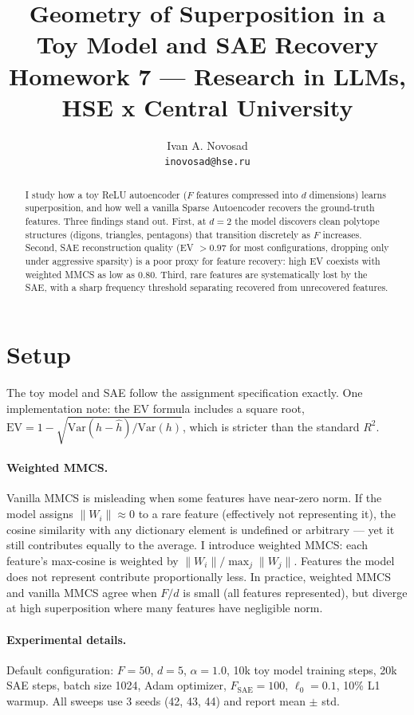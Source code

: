 \documentclass[10pt,twocolumn]{article}
\title{Geometry of Superposition in a Toy Model and SAE Recovery \\[6pt]
       \normalsize Homework 7 --- Research in LLMs, HSE x Central University}
\author{Ivan A. Novosad \\ \texttt{inovosad@hse.ru}}
\date{}
\begin{document}
\maketitle

\begin{abstract}
I study how a toy ReLU autoencoder ($F$ features compressed into $d$ dimensions)
learns superposition, and how well a vanilla Sparse Autoencoder recovers the
ground-truth features. Three findings stand out. First, at $d{=}2$ the model
discovers clean polytope structures (digons, triangles, pentagons) that transition
discretely as $F$ increases. Second, SAE reconstruction quality (EV $> 0.97$ for most configurations,
dropping only under aggressive sparsity) is a poor proxy for feature recovery: high EV
coexists with weighted MMCS as low as 0.80. Third, rare features are
systematically lost by the SAE, with a sharp frequency threshold separating
recovered from unrecovered features.
\end{abstract}

\section{Setup}
\label{sec:setup}

The toy model and SAE follow the assignment specification exactly. One
implementation note: the EV formula includes a square root,
$\text{EV} = 1 - \sqrt{\text{Var}(h - \hat{h}) / \text{Var}(h)}$,
which is stricter than the standard $R^2$.

\paragraph{Weighted MMCS.}
Vanilla MMCS is misleading when some features have near-zero norm. If the model
assigns $\|W_i\| \approx 0$ to a rare feature (effectively not representing it),
the cosine similarity with any dictionary element is undefined or arbitrary ---
yet it still contributes equally to the average. I introduce weighted MMCS:
each feature's max-cosine is weighted by $\|W_i\| / \max_j \|W_j\|$.
Features the model does not represent contribute proportionally less.
In practice, weighted MMCS and vanilla MMCS agree when $F/d$ is small
(all features represented), but diverge at high superposition where many
features have negligible norm.

\paragraph{Experimental details.}
Default configuration: $F{=}50$, $d{=}5$, $\alpha{=}1.0$, 10k toy model
training steps, 20k SAE steps, batch size 1024, Adam optimizer, $F_{\text{SAE}}{=}100$,
$\ell_0{=}0.1$, 10\% L1 warmup. All sweeps use 3 seeds (42, 43, 44) and
report mean $\pm$ std.
\end{document}
